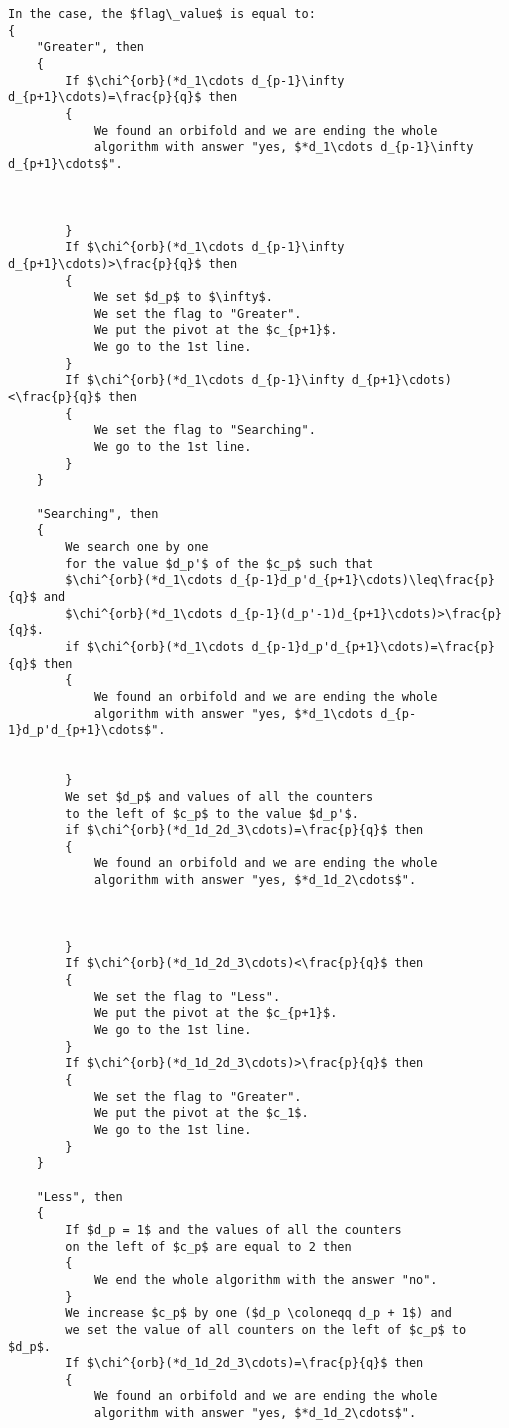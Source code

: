 \begin{lstlisting}[firstnumber=1,consecutivenumbers=true]
In the case, the $flag\_value$ is equal to: 
{
    "Greater", then
    {
        If $\chi^{orb}(*d_1\cdots d_{p-1}\infty d_{p+1}\cdots)=\frac{p}{q}$ then
        {
            We found an orbifold and we are ending the whole
            algorithm with answer "yes, $*d_1\cdots d_{p-1}\infty d_{p+1}\cdots$".
            
            
            
        } 
        If $\chi^{orb}(*d_1\cdots d_{p-1}\infty d_{p+1}\cdots)>\frac{p}{q}$ then
        {
            We set $d_p$ to $\infty$.
            We set the flag to "Greater".
            We put the pivot at the $c_{p+1}$.
            We go to the 1st line.
        }  
        If $\chi^{orb}(*d_1\cdots d_{p-1}\infty d_{p+1}\cdots)<\frac{p}{q}$ then
        {
            We set the flag to "Searching".
            We go to the 1st line.
        }  
    }
    
    "Searching", then
    {
        We search one by one 
        for the value $d_p'$ of the $c_p$ such that
        $\chi^{orb}(*d_1\cdots d_{p-1}d_p'd_{p+1}\cdots)\leq\frac{p}{q}$ and
        $\chi^{orb}(*d_1\cdots d_{p-1}(d_p'-1)d_{p+1}\cdots)>\frac{p}{q}$.
        if $\chi^{orb}(*d_1\cdots d_{p-1}d_p'd_{p+1}\cdots)=\frac{p}{q}$ then 
        {
            We found an orbifold and we are ending the whole
            algorithm with answer "yes, $*d_1\cdots d_{p-1}d_p'd_{p+1}\cdots$".
            
            
        }
        We set $d_p$ and values of all the counters 
        to the left of $c_p$ to the value $d_p'$.
        if $\chi^{orb}(*d_1d_2d_3\cdots)=\frac{p}{q}$ then 
        {
            We found an orbifold and we are ending the whole
            algorithm with answer "yes, $*d_1d_2\cdots$".
            
            
            
        }
        If $\chi^{orb}(*d_1d_2d_3\cdots)<\frac{p}{q}$ then 
        {
            We set the flag to "Less".
            We put the pivot at the $c_{p+1}$.
            We go to the 1st line.
        }
        If $\chi^{orb}(*d_1d_2d_3\cdots)>\frac{p}{q}$ then 
        {
            We set the flag to "Greater".
            We put the pivot at the $c_1$.
            We go to the 1st line.
        }
    }
    
    "Less", then 
    {
        If $d_p = 1$ and the values of all the counters 
        on the left of $c_p$ are equal to 2 then 
        {
            We end the whole algorithm with the answer "no".
        }
        We increase $c_p$ by one ($d_p \coloneqq d_p + 1$) and
        we set the value of all counters on the left of $c_p$ to $d_p$.
        If $\chi^{orb}(*d_1d_2d_3\cdots)=\frac{p}{q}$ then
        {
            We found an orbifold and we are ending the whole
            algorithm with answer "yes, $*d_1d_2\cdots$".
            

\end{lstlisting}
